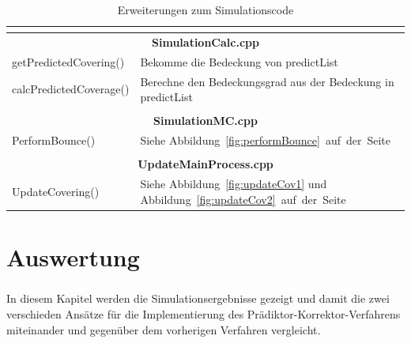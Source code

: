 \documentclass{listhesis}
\begin{document}
\begin{table}
\begin{center}
\begin{tabular}{|l|l|}
\multicolumn{2}{c}{}\\%

\hline
\multicolumn{2}{|c|}{\rule{0pt}{\vsep}\textbf{SimulationCalc.cpp}}\\
\hline
\rule{0pt}{\vsep}getPredictedCovering()&Bekomme die Bedeckung von predictList\\
\rule{0pt}{\vsep}calcPredictedCoverage()&Berechne den Bedeckungsgrad aus der Bedeckung in predictList\\
\hline

\multicolumn{2}{c}{}\\%

\hline
\multicolumn{2}{|c|}{\rule{0pt}{\vsep}\textbf{SimulationMC.cpp}}\\
\hline
\rule{0pt}{\vsep} PerformBounce()&Siehe Abbildung~\ref{fig:performBounce}~auf~der~Seite~\pageref{fig:performBounce}\\
\hline

\multicolumn{2}{c}{}\\%

\hline
\multicolumn{2}{|c|}{\rule{0pt}{\vsep}\textbf{UpdateMainProcess.cpp}}\\
\hline
\rule{0pt}{\vsep} UpdateCovering()&Siehe Abbildung~\ref{fig:updateCov1} und Abbildung~\ref{fig:updateCov2}~auf~der~Seite~\pageref{fig:updateCov2}\\
\hline

\end{tabular}
\end{center}
\caption{Erweiterungen zum Simulationscode}
\label{tab:all}
\end{table}

\chapter{Auswertung} \label{chap:auswertung}
\paragraph{}
In diesem Kapitel werden die Simulationsergebnisse gezeigt und damit die zwei verschieden Ansätze für die Implementierung des Prädiktor-Korrektor-Verfahrens miteinander und gegenüber dem vorherigen Verfahren vergleicht.
\end{document}
